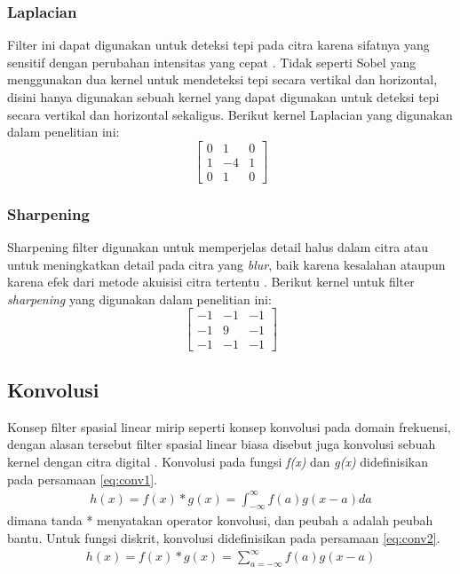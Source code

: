 \subsubsection{Laplacian}
Filter ini dapat digunakan untuk deteksi tepi pada citra karena sifatnya yang sensitif dengan perubahan intensitas yang cepat \cite{pdf:jingbo}. Tidak seperti Sobel yang menggunakan dua kernel untuk mendeteksi tepi secara vertikal dan horizontal, disini hanya digunakan sebuah kernel yang dapat digunakan untuk deteksi tepi secara vertikal dan horizontal sekaligus. Berikut kernel Laplacian yang digunakan dalam penelitian ini:
\begin{equation}
    \label{kernel:laplacian}
    \left[
    \begin{matrix}
 0 & 1 & 0 \\
 1 & -4 & 1 \\
 0 & 1 & 0
    \end{matrix}
    \right]
\end{equation}

\subsubsection{Sharpening}
Sharpening filter digunakan untuk memperjelas detail halus dalam citra atau untuk meningkatkan detail pada citra yang \textit{blur}, baik karena kesalahan ataupun karena efek dari metode akuisisi citra tertentu \cite{pdf:ching}. Berikut kernel untuk filter \textit{sharpening} yang digunakan dalam penelitian ini:
\begin{equation}
    \label{kernel:sharpen}
    \left[
    \begin{matrix}
 -1 & -1 & -1 \\
 -1 & 9 & -1 \\
 -1 & -1 & -1
    \end{matrix}
    \right]
\end{equation}


\subsection{Konvolusi}
Konsep filter spasial linear mirip seperti konsep konvolusi pada domain frekuensi, dengan alasan tersebut filter spasial linear biasa disebut juga konvolusi sebuah kernel dengan citra digital \cite{book:gonzalez}. Konvolusi pada fungsi \textit{f(x)} dan \textit{g(x)} didefinisikan pada persamaan \ref{eq:conv1}.
\begin{equation}
    \label{eq:conv1}
    \begin{split}
h(x) = f(x) * g(x) = \int_{-\infty}^{\infty} f(a) g(x-a) da
    \end{split}
\end{equation}
dimana tanda * menyatakan operator konvolusi, dan peubah a adalah peubah bantu. Untuk fungsi diskrit, konvolusi didefinisikan pada persamaan \ref{eq:conv2}.
\begin{equation}
    \label{eq:conv2}
    \begin{split}
h(x) = f(x) * g(x) = \sum_{a=-\infty}^{\infty} f(a)g(x-a)
    \end{split}
\end{equation}

